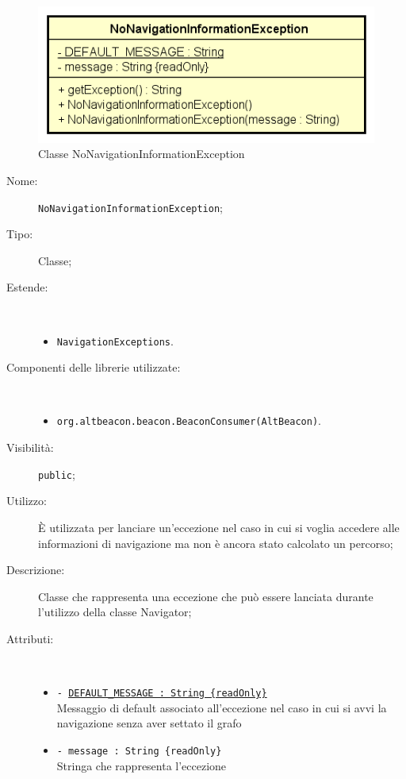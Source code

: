 \documentclass[../DefinizioneDiProdotto.tex]{subfiles}
\begin{document}
    \begin{figure}[H]
        \centering
        \includegraphics{img/NoNavigationInformationException.png}
        \caption{Classe NoNavigationInformationException}\label{fig:model::navigator::NoNavigationInformationException} 
    \end{figure}
    \begin{description}
\item[Nome:] \texttt{NoNavigationInformationException};
\item[Tipo:] Classe;
\item[Estende:] \
\begin{itemize}
\item \texttt{NavigationExceptions}.
\end{itemize}
\item[Componenti delle librerie utilizzate:] \
\begin{itemize}
\item \texttt{org.altbeacon.beacon.BeaconConsumer(AltBeacon)}.

\end{itemize}
\item[Visibilità:] \texttt{public};
\item[Utilizzo:] È utilizzata per lanciare un'eccezione nel caso in cui si voglia accedere alle informazioni di navigazione ma non è ancora stato calcolato un percorso;
\item[Descrizione:] Classe che rappresenta una eccezione che può essere lanciata durante l'utilizzo della classe Navigator;
\item[Attributi:] \
\begin{itemize}
\item \texttt{- \underline{DEFAULT\_MESSAGE : String \{readOnly\}}}\\
Messaggio di default associato all'eccezione nel caso in cui si avvi la navigazione senza aver settato il grafo

\item \texttt{- message : String \{readOnly\}}\\
Stringa che rappresenta l'eccezione


\end{itemize}
\end{description}
\end{document}
